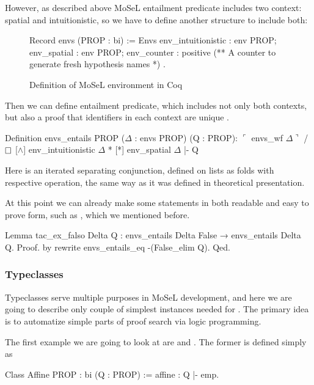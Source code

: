 However, as described above MoSeL entailment predicate includes two context: spatial and intuitionistic, so we have to define another structure to include both:

\begin{figure}[H]
\centering
\begin{coq}
Record envs (PROP : bi) := Envs {
  env_intuitionistic : env PROP;
  env_spatial : env PROP;
  env_counter : positive (** A counter to generate fresh hypothesis names *)
}.
\end{coq}
\caption{Definition of MoSeL environment in Coq}
\label{fig:coq_envs}
\end{figure}


Then we can define entailment predicate, which includes not only both contexts, but also a proof that identifiers in each context are unique .
\begin{coq}
  Definition envs_entails {PROP} ($\Delta$ : envs PROP) (Q : PROP):
  $\ulcorner$ envs_wf $\Delta \urcorner$ /\ $\mathop{\Box}$ [$\wedge$] env_intuitionistic $\Delta$ * [*] env_spatial $\Delta$ |- Q
\end{coq}

Here \coqe{[*]} is an iterated separating conjunction, defined on lists as folds with respective operation, the same way as it was defined in theoretical presentation.

At this point we can already make some statements in both readable and easy to prove form, such as , which we mentioned before.

\begin{coq}
Lemma tac_ex_falso Delta Q : envs_entails Delta False → envs_entails Delta Q.
Proof. by rewrite envs_entails_eq -(False_elim Q). Qed.
\end{coq}

\subsubsection{Typeclasses}
\label{subsubsec:typeclasses}

Typeclasses serve multiple purposes in MoSeL development, and here we are going to describe only couple of simplest instances needed for .
The primary idea is to automatize simple parts of proof search via logic programming.

The first example we are going to look at are  and .
The former is defined simply as
\begin{coq}
Class Affine {PROP : bi} (Q : PROP) := affine : Q |- emp.
\end{coq}

